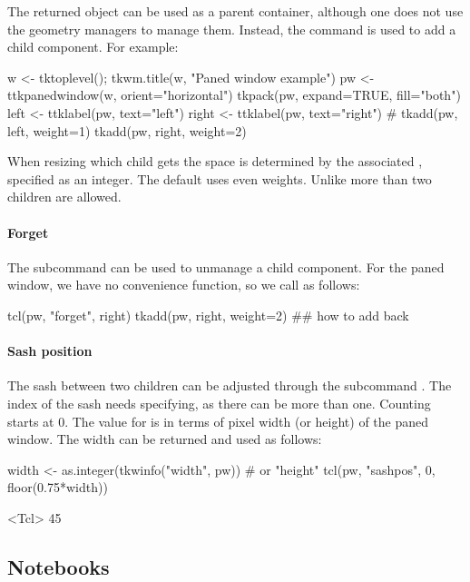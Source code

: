 The returned object can be used as a parent container, although one
does not use the geometry managers to manage them. Instead, the
 command is used to add a child component. For example:
\begin{Schunk}
\begin{Sinput}
 w <- tktoplevel(); tkwm.title(w, "Paned window example")
 pw <- ttkpanedwindow(w, orient="horizontal")
 tkpack(pw, expand=TRUE, fill="both")
 left <- ttklabel(pw, text="left")
 right <- ttklabel(pw, text="right")
 #
 tkadd(pw, left, weight=1)
 tkadd(pw, right, weight=2)
\end{Sinput}
\end{Schunk}
%
When resizing which child gets the space is determined by the
associated , specified as an integer. The default uses
even weights.  Unlike \GTK\/ more than two children are allowed.

\paragraph{Forget}
The subcommand  can be used to
unmanage a child component. For the paned window, we have no
convenience function, so we call as follows:
\begin{Schunk}
\begin{Sinput}
 tcl(pw, "forget", right)
 tkadd(pw, right, weight=2) ## how to add back
\end{Sinput}
\end{Schunk}
%
\paragraph{Sash position}
The sash between two children can be adjusted through the subcommand
. The index of the sash needs
specifying, as there can be more than one. Counting starts at 0. The
value for  is in terms of pixel width (or height) of the
paned window. The width can be returned and used as follows:
\begin{Schunk}
\begin{Sinput}
 width <- as.integer(tkwinfo("width", pw))  # or "height"
 tcl(pw, "sashpos", 0, floor(0.75*width))
\end{Sinput}
\begin{Soutput}
<Tcl> 45 
\end{Soutput}
\end{Schunk}
%

\subsection{Notebooks}
\label{sec:tcltk:notebooks}

